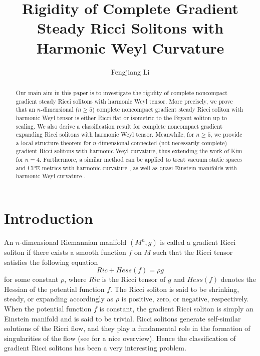 \documentclass{amsart}
\theoremstyle{definition}
\theoremstyle{remark}
\numberwithin{equation}{section}
\begin{document}
\makeatletter
{}
\makeatother

\author{Fengjiang Li}
\address[]{School of Mathematical Sciences\\ East China Normal University\\
	Shanghai, 200241}



\title[Gradient Steady Ricci Solitons with Harmonic Weyl Curvature]
{Rigidity of Complete Gradient Steady Ricci Solitons with Harmonic Weyl Curvature}


\begin{abstract}
Our main aim in this paper is to investigate the rigidity of complete noncompact gradient steady Ricci solitons with harmonic Weyl tensor. More precisely, we prove that an $n$-dimensional ($n\geq 5$) complete noncompact gradient steady Ricci soliton with harmonic Weyl tensor is either Ricci flat or isometric to the Bryant soliton up to scaling. We also derive a classification result for complete noncompact gradient expanding Ricci solitons with harmonic Weyl tensor. 
Meanwhile, for $n\ge 5$, we provide a local structure theorem for $n$-dimensional connected (not necessarily complete) gradient Ricci solitons with harmonic Weyl curvature, thus extending the work of Kim \cite{Kim} for $n=4$. 
Furthermore, a similar method can be applied to treat vacuum static spaces and CPE metrics with harmonic curvature \cite {F-M-1, CL}, as well as quasi-Einstein manifolds with harmonic Weyl curvature \cite{CLS}.
\end{abstract}

\maketitle

\section{Introduction}
An $n$-dimensional Riemannian manifold $(M^{n},g)$ is called a gradient Ricci soliton if there exists a smooth function $f$ on $M$ such that the Ricci tensor satisfies the following equation
\begin{equation}\label{1.1}
Ric+Hess(f)=\rho g
\end{equation}
for some constant $\rho$, where $Ric$ is the Ricci tensor of $g$ and $Hess(f)$ denotes the Hessian of the potential function $f$. 
The Ricci soliton is said to be shrinking, steady, or expanding accordingly as $\rho$ is positive, zero, or negative, respectively. When the potential function $f$ is constant, the gradient Ricci soliton is simply an Einstein manifold and is said to be trivial. Ricci solitons generate self-similar solutions of the Ricci flow, 
and they play a fundamental role in the formation of singularities of the flow (see \cite{Cao1} for a nice overview).
Hence the classification of gradient Ricci solitons has been a very interesting problem. 
\end{document}
